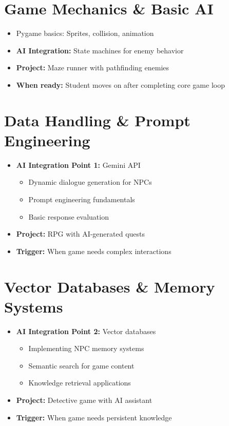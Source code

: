 \documentclass{article}
\begin{document}
\section{Game Mechanics \& Basic AI}
\begin{itemize}[nosep]
    \item Pygame basics: Sprites, collision, animation
    \item \textbf{AI Integration:} State machines for enemy behavior
    \item \textbf{Project:} Maze runner with pathfinding enemies
    \item \textbf{When ready:} Student moves on after completing core game loop
\end{itemize}

\section{Data Handling \& Prompt Engineering}
\begin{itemize}[nosep]
    \item \textbf{AI Integration Point 1:} Gemini API
    \begin{itemize}
        \item Dynamic dialogue generation for NPCs
        \item Prompt engineering fundamentals
        \item Basic response evaluation
    \end{itemize}
    \item \textbf{Project:} RPG with AI-generated quests
    \item \textbf{Trigger:} When game needs complex interactions
\end{itemize}

\section{Vector Databases \& Memory Systems}
\begin{itemize}[nosep]
    \item \textbf{AI Integration Point 2:} Vector databases
    \begin{itemize}
        \item Implementing NPC memory systems
        \item Semantic search for game content
        \item Knowledge retrieval applications
    \end{itemize}
    \item \textbf{Project:} Detective game with AI assistant
    \item \textbf{Trigger:} When game needs persistent knowledge
\end{itemize}
\end{document}
